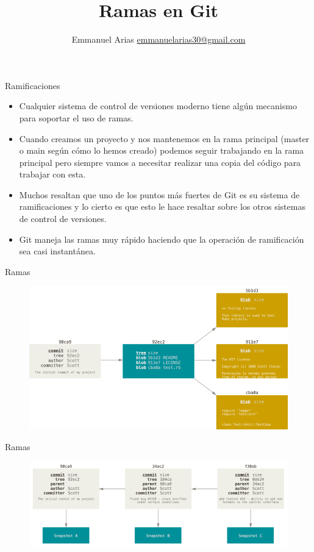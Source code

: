 \documentclass{beamer}
\title{Ramas en Git}
\author{Emmanuel Arias \href{mailto:emmanuelarias30@gmail.com}{emmanuelarias30@gmail.com}}
\date{}
\begin{document}
\begin{frame}[plain]
    \maketitle
\end{frame}

\begin{frame}{Ramificaciones}
	\begin{itemize}
		 \item Cualquier sistema de control de versiones moderno tiene algún mecanismo para soportar el uso de ramas.
		 \item Cuando creamos un proyecto y nos mantenemos en la rama principal (master o main según cómo lo hemos creado) podemos seguir trabajando en la rama principal pero siempre vamos a necesitar realizar una copia del código para trabajar con esta.
		\item Muchos resaltan que uno de los puntos más fuertes de Git es su sistema de ramificaciones y lo cierto es que esto le hace resaltar sobre los otros sistemas de control de versiones. 
		\item Git maneja las ramas muy rápido haciendo que la operación de ramificación sea casi instantánea.
	\end{itemize}
\end{frame}

\begin{frame}{Ramas}
\begin{figure}
	\centering
	\includegraphics[width=1\linewidth]{img/commit-and-tree}
	\label{fig:commit-and-tree}
\end{figure}
\end{frame}

\begin{frame}{Ramas}
\begin{figure}
	\centering
	\includegraphics[width=1\linewidth]{img/2}
	\label{fig:2}
\end{figure}
\end{frame}
\end{document}
